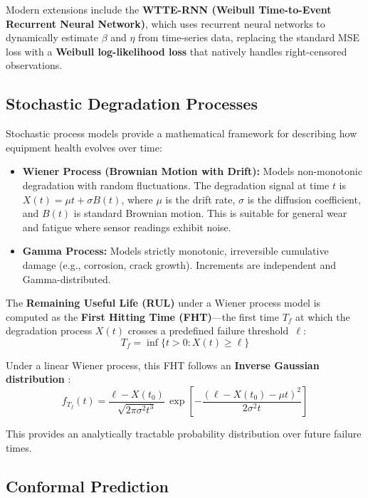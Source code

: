 \documentclass[12pt, a4paper]{article}
\begin{document}
Modern extensions include the \textbf{WTTE-RNN (Weibull Time-to-Event Recurrent Neural Network)}, which uses recurrent neural networks to dynamically estimate $\beta$ and $\eta$ from time-series data, replacing the standard MSE loss with a \textbf{Weibull log-likelihood loss} that natively handles right-censored observations.

\subsection{Stochastic Degradation Processes}

Stochastic process models provide a mathematical framework for describing how equipment health evolves over time:

\begin{itemize}[leftmargin=*]
    \item \textbf{Wiener Process (Brownian Motion with Drift):} Models non-monotonic degradation with random fluctuations. The degradation signal at time $t$ is $X(t) = \mu t + \sigma B(t)$, where $\mu$ is the drift rate, $\sigma$ is the diffusion coefficient, and $B(t)$ is standard Brownian motion. This is suitable for general wear and fatigue where sensor readings exhibit noise.
    \item \textbf{Gamma Process:} Models strictly monotonic, irreversible cumulative damage (e.g., corrosion, crack growth). Increments are independent and Gamma-distributed.
\end{itemize}

The \textbf{Remaining Useful Life (RUL)} under a Wiener process model is computed as the \textbf{First Hitting Time (FHT)}---the first time $T_f$ at which the degradation process $X(t)$ crosses a predefined failure threshold~$\ell$:
\begin{equation}\label{eq:fht}
    T_f = \inf\{t > 0 : X(t) \geq \ell\}
\end{equation}

Under a linear Wiener process, this FHT follows an \textbf{Inverse Gaussian distribution} \citep{si2011,ye2015}:
\begin{equation}\label{eq:ig-pdf}
    f_{T_f}(t) = \frac{\ell - X(t_0)}{\sqrt{2\pi\sigma^2 t^3}}\,\exp\!\left[-\frac{(\ell - X(t_0) - \mu t)^2}{2\sigma^2 t}\right]
\end{equation}

This provides an analytically tractable probability distribution over future failure times.

\subsection{Conformal Prediction}
\end{document}
